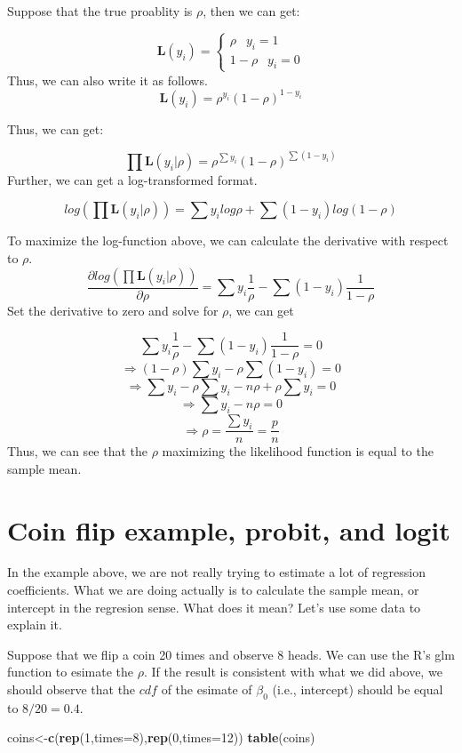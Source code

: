 \documentclass[
]{book}
\newenvironment{Shaded}{\begin{snugshade}}{\end{snugshade}}
\newcommand{\DataTypeTok}[1]{\textcolor[rgb]{0.13,0.29,0.53}{#1}}
\newcommand{\DecValTok}[1]{\textcolor[rgb]{0.00,0.00,0.81}{#1}}
\newcommand{\KeywordTok}[1]{\textcolor[rgb]{0.13,0.29,0.53}{\textbf{#1}}}
\newcommand{\NormalTok}[1]{#1}
\begin{document}
Suppose that the true proablity is \(\rho\), then we can get:

\[
\mathbf{L}(y_i)=\begin{cases} \rho \;\;\:   y_i = 1 \\ 1-\rho \;\;\:  y_i = 0 \end{cases}
\]
Thus, we can also write it as follows.
\[\mathbf{L}(y_i) = \rho^{y_i}(1-\rho)^{1-y_i}\]

Thus, we can get:

\[\prod \mathbf{L}(y_i|\rho)=\rho^{\sum y_i}(1-\rho)^{\sum(1-y_i)}\]
Further, we can get a log-transformed format.

\[log (\prod \mathbf{L}(y_i|\rho))=\sum y_i log \rho + \sum(1-y_i) log(1-\rho)\]

To maximize the log-function above, we can calculate the derivative with respect to \(\rho\).
\[\frac{\partial log (\prod \mathbf{L}(y_i|\rho)) }{\partial \rho}=\sum y_i \frac{1}{\rho}-\sum(1-y_i) \frac{1}{1-\rho}\]
Set the derivative to zero and solve for \(\rho\), we can get

\[\sum y_i \frac{1}{\rho}-\sum(1-y_i) \frac{1}{1-\rho}=0\]
\[\Rightarrow (1-\rho)\sum y_i - \rho \sum(1-y_i) =0\]
\[\Rightarrow \sum y_i-\rho\sum y_i - n\rho +\rho\sum y_i =0\]
\[\Rightarrow \sum y_i - n\rho  =0\]
\[\Rightarrow \rho  = \frac{\sum y_i}{n}=\frac{p}{n}\]
Thus, we can see that the \(\rho\) maximizing the likelihood function is equal to the sample mean.

\hypertarget{coin-flip-example-probit-and-logit}{%
\section{Coin flip example, probit, and logit}\label{coin-flip-example-probit-and-logit}}

In the example above, we are not really trying to estimate a lot of regression coefficients. What we are doing actually is to calculate the sample mean, or intercept in the regresion sense. What does it mean? Let's use some data to explain it.

Suppose that we flip a coin 20 times and observe 8 heads. We can use the R's glm function to esimate the \(\rho\). If the result is consistent with what we did above, we should observe that the \(cdf\) of the esimate of \(\beta_0\) (i.e., intercept) should be equal to \(8/20=0.4\).

\begin{Shaded}
\begin{Highlighting}[]
\NormalTok{coins<-}\KeywordTok{c}\NormalTok{(}\KeywordTok{rep}\NormalTok{(}\DecValTok{1}\NormalTok{,}\DataTypeTok{times=}\DecValTok{8}\NormalTok{),}\KeywordTok{rep}\NormalTok{(}\DecValTok{0}\NormalTok{,}\DataTypeTok{times=}\DecValTok{12}\NormalTok{))}
\KeywordTok{table}\NormalTok{(coins)}
\end{Highlighting}
\end{Shaded}
\end{document}
